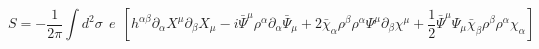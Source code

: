 \begin{equation}
S= -\frac{1}{2\pi}\int d^2\sigma ~~e~~\left [ h^{\alpha\beta}\partial_{\alpha}X^{\mu }
\partial_{\beta}X_{\mu } -i\bar \Psi^{\mu}\rho^{\alpha}\partial_{\alpha}
\bar \Psi_{\mu}+ 2\bar{\chi}_{\alpha}\rho^{\beta}\rho^{\alpha}\Psi^{\mu}
\partial_{\beta}\chi^{\mu}+\frac{1}{2}
\bar{\Psi }^{\mu}\Psi_{\mu}\bar{\chi}_{\beta} \rho^{\beta}\rho^{\alpha}\chi_{\alpha}
\right ]\label{d}
\end{equation}

